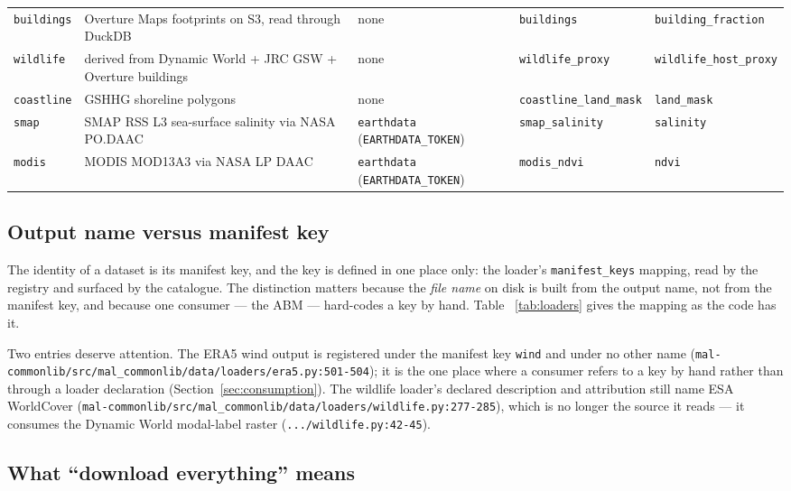 \documentclass[11pt,a4paper]{article}
\newcommand{\code}[1]{\texttt{#1}}
\begin{document}
\begin{longtable}{@{}p{1.9cm}p{3.4cm}p{2.9cm}p{3.3cm}p{2.7cm}@{}}
\code{buildings} & Overture Maps footprints on S3, read through DuckDB & none &
\code{buildings} & \code{building\allowbreak\_fraction} \\
\code{wildlife} & derived from Dynamic World + JRC GSW + Overture buildings &
none & \code{wildlife\_proxy} &
\code{wildlife\allowbreak\_host\allowbreak\_proxy} \\
\code{coastline} & GSHHG shoreline polygons & none &
\code{coastline\allowbreak\_land\allowbreak\_mask} &
\code{land\allowbreak\_mask} \\
\code{smap} & SMAP RSS L3 sea-surface salinity via NASA PO.DAAC &
\code{earthdata} (\code{EARTHDATA\_TOKEN}) & \code{smap\_salinity} &
\code{salinity} \\
\code{modis} & MODIS MOD13A3 via NASA LP DAAC & \code{earthdata}
(\code{EARTHDATA\_TOKEN}) & \code{modis\_ndvi} & \code{ndvi} \\
\bottomrule
\end{longtable}
\normalsize
\label{tab:loaders}

\subsection{Output name versus manifest key}

The identity of a dataset is its manifest key, and the key is defined in one
place only: the loader's \code{manifest\_keys} mapping, read by the registry
and surfaced by the catalogue. The distinction matters because the \emph{file
name} on disk is built from the output name, not from the manifest key, and
because one consumer --- the ABM --- hard-codes a key by hand. Table~
\ref{tab:loaders} gives the mapping as the code has it.

Two entries deserve attention. The ERA5 wind output is registered under the
manifest key \code{wind} and under no other name
(\code{mal-commonlib/src/mal\_commonlib/data/loaders/era5.py:501-504}); it is
the one place where a consumer refers to a key by hand rather than through a
loader declaration (Section~\ref{sec:consumption}). The wildlife loader's
declared description and attribution still name ESA WorldCover
(\code{mal-commonlib/src/mal\_commonlib/data/loaders/wildlife.py:277-285}),
which is no longer the source it reads --- it consumes the Dynamic World
modal-label raster (\code{.../wildlife.py:42-45}).

\subsection{What ``download everything'' means}
\label{sec:profile}
\end{document}
